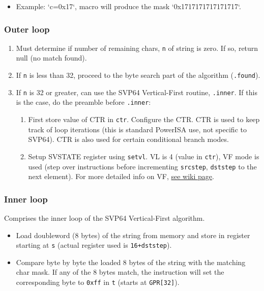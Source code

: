 \begin{itemize}
  \item Example: `c=0x17`, macro will produce the mask `0x1717171717171717`.
\end{itemize}

\subsubsection{Outer loop}

\begin{enumerate}
  \item Must determine if number of remaining chars, \texttt{n} of
  string is zero. If so, return null (no match found).
  \item If \texttt{n} is less than 32, proceed to the byte search part of
  the algorithm (\texttt{.found}).
  \item If \texttt{n} is 32 or greater, can use the SVP64 Vertical-First
  routine, \texttt{.inner}. If this is the case, do the preamble
  before \texttt{.inner}:
  \begin{enumerate}
    \item First store value of \acrshort{CTR} in \texttt{ctr}.
    Configure the \acrshort{CTR}. \acrshort{CTR} is used to keep
    track of loop iterations (this is standard PowerISA use,
    not specific to SVP64). \acrshort{CTR} is also used for
    certain conditional branch modes.
    \item Setup \acrshort{SVSTATE} register using \texttt{setvl}.
    \acrfull{VL} is 4 (value in \texttt{ctr}), \acrfull{VF} mode is used
    (step over instructions before
    incrementing \texttt{srcstep}, \texttt{dststep} to the next element).
    For more detailed info on \acrshort{VF},
    \href{https://libre-soc.org/openpower/sv/svstep/}{see wiki page}.
  \end{enumerate}
\end{enumerate}

\subsubsection{Inner loop}

Comprises the inner loop of the \acrshort{SVP64} Vertical-First algorithm.

\begin{itemize}
  \item Load doubleword (8 bytes) of the string from memory and store in 
register starting at \texttt{s} (actual register used is \texttt{16+dststep}).
  \item Compare byte by byte the loaded 8 bytes of the string with the matching
char mask. If any of the 8 bytes match, the instruction will set
the corresponding byte to \texttt{0xff} in \texttt{t}
(starts at \texttt{GPR[32]}).
\end{itemize}

